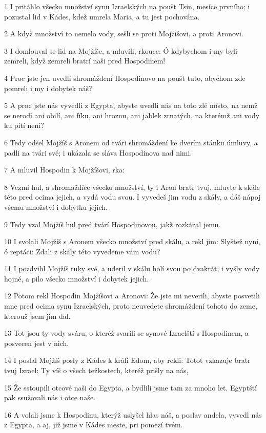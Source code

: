 \par 1 I pritáhlo všecko množství synu Izraelských na poušt Tsin, mesíce prvního; i pozustal lid v Kádes, kdež umrela Maria, a tu jest pochována.
\par 2 A když množství to nemelo vody, sešli se proti Mojžíšovi, a proti Aronovi.
\par 3 I domlouval se lid na Mojžíše, a mluvili, rkouce: Ó kdybychom i my byli zemreli, když zemreli bratrí naši pred Hospodinem!
\par 4 Proc jste jen uvedli shromáždení Hospodinovo na poušt tuto, abychom zde pomreli i my i dobytek náš?
\par 5 A proc jste nás vyvedli z Egypta, abyste uvedli nás na toto zlé místo, na nemž se nerodí ani obilí, ani fíku, ani hroznu, ani jablek zrnatých, na kterémž ani vody ku pití není?
\par 6 Tedy odšel Mojžíš s Aronem od tvári shromáždení ke dverím stánku úmluvy, a padli na tvári své; i ukázala se sláva Hospodinova nad nimi.
\par 7 A mluvil Hospodin k Mojžíšovi, rka:
\par 8 Vezmi hul, a shromáždíce všecko množství, ty i Aron bratr tvuj, mluvte k skále této pred ocima jejich, a vydá vodu svou. I vyvedeš jim vodu z skály, a dáš nápoj všemu množství i dobytku jejich.
\par 9 Tedy vzal Mojžíš hul pred tvárí Hospodinovou, jakž rozkázal jemu.
\par 10 I svolali Mojžíš s Aronem všecko množství pred skálu, a rekl jim: Slyštež nyní, ó reptáci: Zdali z skály této vyvedeme vám vodu?
\par 11 I pozdvihl Mojžíš ruky své, a uderil v skálu holí svou po dvakrát; i vyšly vody hojné, a pilo všecko množství i dobytek jejich.
\par 12 Potom rekl Hospodin Mojžíšovi a Aronovi: Že jste mi neverili, abyste posvetili mne pred ocima synu Izraelských, proto neuvedete shromáždení tohoto do zeme, kterouž jsem jim dal.
\par 13 Tot jsou ty vody sváru, o kteréž svarili se synové Izraelští s Hospodinem, a posvecen jest v nich.
\par 14 I poslal Mojžíš posly z Kádes k králi Edom, aby rekli: Totot vzkazuje bratr tvuj Izrael: Ty víš o všech težkostech, kteréž prišly na nás,
\par 15 Že sstoupili otcové naši do Egypta, a bydlili jsme tam za mnoho let. Egyptští pak ssužovali nás i otce naše.
\par 16 A volali jsme k Hospodinu, kterýž uslyšel hlas náš, a poslav andela, vyvedl nás z Egypta, a aj, již jsme v Kádes meste, pri pomezí tvém.
